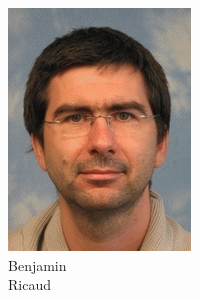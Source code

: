 \documentclass[aspectratio=169]{beamer}
\begin{document}
\begin{frame}
\begin{figure}
\begin{subfigure}[b]{0.14\linewidth}
			\includegraphics[width=\linewidth]{picture_benjamin}
			\caption*{Benjamin\\Ricaud}
		\end{subfigure}
		\hfill
		\begin{subfigure}[b]{0.14\linewidth}

\end{subfigure}
\end{figure}
\end{frame}
\end{document}
